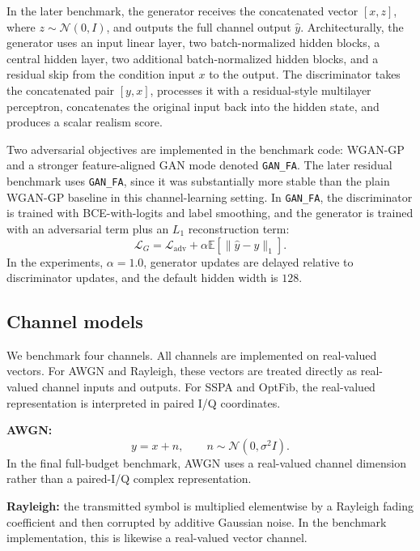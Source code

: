 In the later benchmark, the generator receives the concatenated vector \([x, z]\), where \(z \sim \mathcal{N}(0, I)\), and outputs the full channel output \(\hat{y}\).
Architecturally, the generator uses an input linear layer, two batch-normalized hidden blocks, a central hidden layer, two additional batch-normalized hidden blocks, and a residual skip from the condition input \(x\) to the output.
The discriminator takes the concatenated pair \([y, x]\), processes it with a residual-style multilayer perceptron, concatenates the original input back into the hidden state, and produces a scalar realism score.

Two adversarial objectives are implemented in the benchmark code: WGAN-GP and a stronger feature-aligned GAN mode denoted \texttt{GAN\_FA}.
The later residual benchmark uses \texttt{GAN\_FA}, since it was substantially more stable than the plain WGAN-GP baseline in this channel-learning setting.
In \texttt{GAN\_FA}, the discriminator is trained with BCE-with-logits and label smoothing, and the generator is trained with an adversarial term plus an \(L_1\) reconstruction term:
\begin{equation}
\mathcal{L}_{G}
=
\mathcal{L}_{\text{adv}}
+
\alpha
\mathbb{E}\left[\|\hat{y} - y\|_1\right].
\end{equation}
In the experiments, \(\alpha = 1.0\), generator updates are delayed relative to discriminator updates, and the default hidden width is \(128\).

\subsection{Channel models}
We benchmark four channels.
All channels are implemented on real-valued vectors.
For AWGN and Rayleigh, these vectors are treated directly as real-valued channel inputs and outputs.
For SSPA and OptFib, the real-valued representation is interpreted in paired I/Q coordinates.

\textbf{AWGN:}
\begin{equation}
y = x + n,
\qquad
n \sim \mathcal{N}(0, \sigma^2 I).
\end{equation}
In the final full-budget benchmark, AWGN uses a real-valued channel dimension rather than a paired-I/Q complex representation.

\textbf{Rayleigh:}
the transmitted symbol is multiplied elementwise by a Rayleigh fading coefficient and then corrupted by additive Gaussian noise.
In the benchmark implementation, this is likewise a real-valued vector channel.

